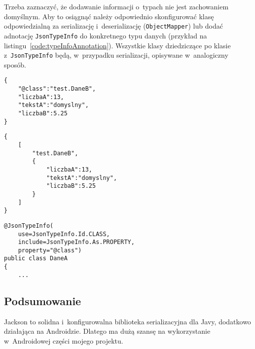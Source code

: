 \begin{description}
Trzeba zaznaczyć, że dodawanie informacji o~typach nie jest zachowaniem domyślnym. Aby to osiągnąć należy odpowiednio skonfigurować klasę odpowiedzialną za serializację i~deserializację (\texttt{ObjectMapper}) lub dodać adnotację \texttt{JsonTypeInfo} do konkretnego typu danych (przykład na listingu~\ref{code:typeInfoAnnotation}). Wszystkie klasy dziedziczące po klasie z~\texttt{JsonTypeInfo} będą, w~przypadku serializacji, opisywane w~analogiczny sposób.

\begin{lstlisting}[float, frame=single, caption={Oznaczanie typu przez dodatkowe pole.}, label=code:typeInfoField]
{
    "@class":"test.DaneB",
    "liczbaA":13,
    "tekstA":"domyslny",
    "liczbaB":5.25
}
\end{lstlisting}

\begin{lstlisting}[float, frame=single, caption={Oznaczanie typu przez owinięcie w~tablicę i~dodanie do niej elementu.}, label=code:typeInfoArray]
{
    [
        "test.DaneB",
        {
            "liczbaA":13,
            "tekstA":"domyslny",
            "liczbaB":5.25
        }
    ]
}
\end{lstlisting}

\begin{lstlisting}[float, frame=single, caption={Parametryzacja przekazywania informacji o~typie w~definicji klasy.}, label=code:typeInfoAnnotation]
@JsonTypeInfo(
    use=JsonTypeInfo.Id.CLASS,
    include=JsonTypeInfo.As.PROPERTY,
    property="@class")
public class DaneA
{
    ...
\end{lstlisting}
\end{description}

\subsection{Podsumowanie}
Jackson to solidna i~konfigurowalna biblioteka serializacyjna dla Javy, dodatkowo działająca na Androidzie.
Dlatego ma dużą szansę na wykorzystanie w~Androidowej części mojego projektu.

